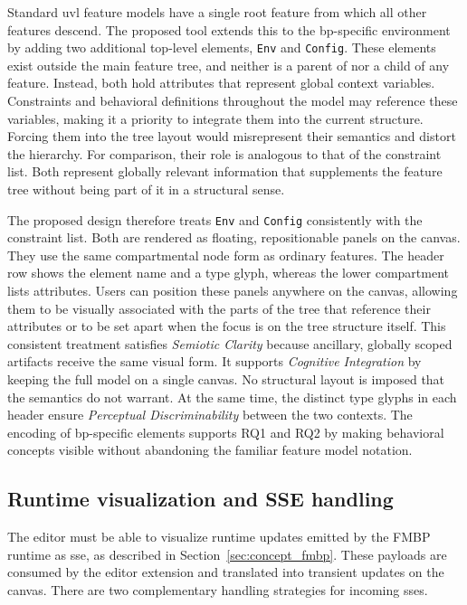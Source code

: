 Standard \gls{uvl} feature models have a single root feature from which all other features descend.
The proposed tool extends this to the \gls{bp}-specific environment by adding two additional top-level elements, \texttt{Env} and \texttt{Config}.
These elements exist outside the main feature tree, and neither is a parent of nor a child of any feature.
Instead, both hold attributes that represent global context variables.
Constraints and behavioral definitions throughout the model may reference these variables, making it a priority to integrate them into the current structure.
Forcing them into the tree layout would misrepresent their semantics and distort the hierarchy.
For comparison, their role is analogous to that of the constraint list.
Both represent globally relevant information that supplements the feature tree without being part of it in a structural sense.
 
The proposed design therefore treats \texttt{Env} and \texttt{Config} consistently with the constraint list.
Both are rendered as floating, repositionable panels on the canvas.
They use the same compartmental node form as ordinary features.
The header row shows the element name and a type glyph, whereas the lower compartment lists attributes.
Users can position these panels anywhere on the canvas, allowing them to be visually associated with the parts of the tree that reference their attributes or to be set apart when the focus is on the tree structure itself.
This consistent treatment satisfies \textit{Semiotic Clarity} because ancillary, globally scoped artifacts receive the same visual form.
It supports \textit{Cognitive Integration} by keeping the full model on a single canvas.
No structural layout is imposed that the semantics do not warrant.
At the same time, the distinct type glyphs in each header ensure \textit{Perceptual Discriminability} between the two contexts.
The encoding of \gls{bp}-specific elements supports RQ1 and RQ2 by making behavioral concepts visible without abandoning the familiar feature model notation.

\subsection{Runtime visualization and SSE handling}
\label{subsec:vis_runtime_sse}

The editor must be able to visualize runtime updates emitted by the FMBP runtime as \gls{sse}, as described in Section~\ref{sec:concept_fmbp}.
These payloads are consumed by the editor extension and translated into transient updates on the canvas.
There are two complementary handling strategies for incoming \glspl{sse}.

